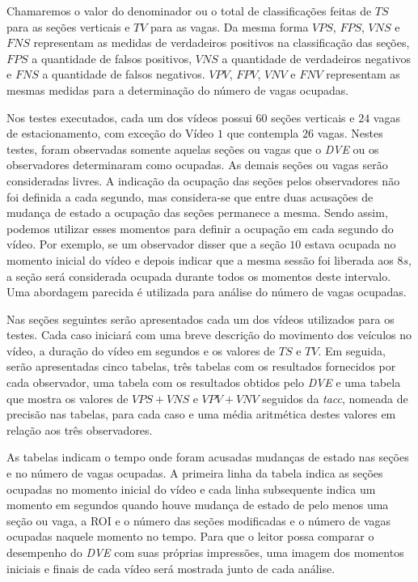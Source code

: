 Chamaremos o valor do denominador ou o total de classificações feitas de $TS$ para as seções verticais e $TV$ para as vagas. Da mesma forma $VPS$, $FPS$, $VNS$ e $FNS$ representam as medidas de verdadeiros positivos na classificação das seções, $FPS$ a quantidade de falsos positivos, $VNS$ a quantidade de verdadeiros negativos e $FNS$ a quantidade de falsos negativos. $VPV$, $FPV$, $VNV$ e $FNV$ representam as mesmas medidas para a determinação do número de vagas ocupadas.

Nos testes executados, cada um dos vídeos possui $60$ seções verticais e $24$ vagas de estacionamento, com exceção do Vídeo $1$ que contempla $26$ vagas. Nestes testes, foram observadas somente aquelas seções ou vagas que o \textit{DVE} ou os observadores determinaram como ocupadas. As demais seções ou vagas serão consideradas livres.
A indicação da ocupação das seções pelos observadores não foi definida a cada segundo, mas considera-se que entre duas acusações de mudança de estado a ocupação das seções permanece a mesma. Sendo assim, podemos utilizar esses momentos para definir a ocupação em cada segundo do vídeo. Por exemplo, se um observador disser que a seção $10$ estava ocupada no momento inicial do vídeo e depois indicar que a mesma sessão foi liberada aos $8s$, a seção será considerada ocupada durante todos os momentos deste intervalo. Uma abordagem parecida é utilizada para análise do número de vagas ocupadas.

Nas seções seguintes serão apresentados cada um dos vídeos utilizados para os testes. Cada caso iniciará com uma breve descrição do movimento dos veículos no vídeo, a duração do vídeo em segundos e os valores de $TS$ e $TV$. Em seguida, serão apresentadas cinco tabelas, três tabelas com os resultados fornecidos por cada observador, uma tabela com os resultados obtidos pelo \textit{DVE} e uma tabela que mostra os valores de $VPS + VNS$ e $VPV + VNV$ seguidos da \textit{tacc}, nomeada de precisão nas tabelas, para cada caso e uma média aritmética destes valores em relação aos três observadores.

As tabelas indicam o tempo onde foram acusadas mudanças de estado nas seções e no número de vagas ocupadas. A primeira linha da tabela indica as seções ocupadas no momento inicial do vídeo e cada linha subsequente indica um momento em segundos quando houve mudança de estado de pelo menos uma seção ou vaga, a ROI e o número das seções modificadas e o número de vagas ocupadas naquele momento no tempo. Para que o leitor possa comparar o desempenho do \textit{DVE} com suas próprias impressões, uma imagem dos momentos iniciais e finais de cada vídeo será mostrada junto de cada análise.

